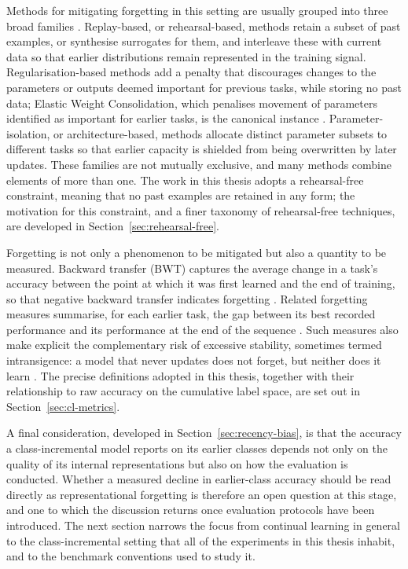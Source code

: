 Methods for mitigating forgetting in this setting are usually grouped into
three broad families \parencite{delange2022continual}. Replay-based, or
rehearsal-based, methods retain a subset of past examples, or synthesise
surrogates for them, and interleave these with current data so that earlier
distributions remain represented in the training signal. Regularisation-based
methods add a penalty that discourages changes to the parameters or outputs
deemed important for previous tasks, while storing no past data; Elastic
Weight Consolidation, which penalises movement of parameters identified as
important for earlier tasks, is the canonical instance \parencite{kirkpatrick2017overcoming}.
Parameter-isolation, or architecture-based, methods allocate
distinct parameter subsets to different tasks so that earlier capacity is
shielded from being overwritten by later updates. These families are not
mutually exclusive, and many methods combine elements of more than one. The
work in this thesis adopts a rehearsal-free constraint, meaning that no
past examples are retained in any form; the motivation for this constraint,
and a finer taxonomy of rehearsal-free techniques, are developed in Section~\ref{sec:rehearsal-free}.

Forgetting is not only a phenomenon to be mitigated but also a quantity to
be measured. Backward transfer (BWT) captures the average change in a
task's accuracy between the point at which it was first learned and the end
of training, so that negative backward transfer indicates forgetting
\parencite{lopezpaz2017gradient}. Related forgetting measures summarise, for
each earlier task, the gap between its best recorded performance and its
performance at the end of the sequence \parencite{chaudhry2018riemannian}. Such
measures also make explicit the complementary risk of excessive stability,
sometimes termed intransigence: a model that never updates does not forget,
but neither does it learn \parencite{chaudhry2018riemannian}. The precise definitions
adopted in this thesis, together with their relationship to raw accuracy on
the cumulative label space, are set out in Section~\ref{sec:cl-metrics}.

A final consideration, developed in Section~\ref{sec:recency-bias}, is that the accuracy a
class-incremental model reports on its earlier classes depends not only on
the quality of its internal representations but also on how the evaluation
is conducted. Whether a measured decline in earlier-class accuracy should
be read directly as representational forgetting is therefore an open
question at this stage, and one to which the discussion returns once
evaluation protocols have been introduced. The next section narrows the
focus from continual learning in general to the class-incremental setting
that all of the experiments in this thesis inhabit, and to the benchmark
conventions used to study it.

